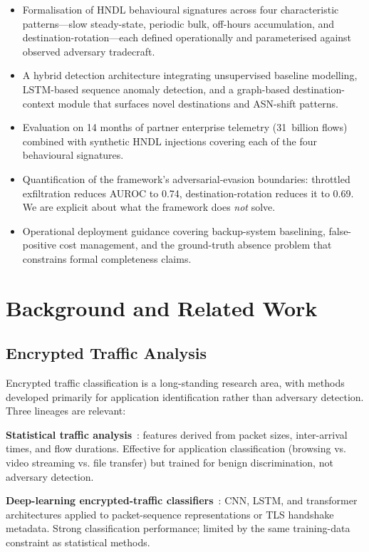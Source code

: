 \documentclass[sigconf,nonacm]{acmart}
\begin{document}
\begin{itemize}
  \item Formalisation of HNDL behavioural signatures across four
        characteristic patterns---slow steady-state, periodic bulk,
        off-hours accumulation, and destination-rotation---each
        defined operationally and parameterised against observed
        adversary tradecraft.
  \item A hybrid detection architecture integrating unsupervised
        baseline modelling, LSTM-based sequence anomaly detection,
        and a graph-based destination-context module that surfaces
        novel destinations and ASN-shift patterns.
  \item Evaluation on 14 months of partner enterprise telemetry
        (31~billion flows) combined with synthetic HNDL injections
        covering each of the four behavioural signatures.
  \item Quantification of the framework's adversarial-evasion
        boundaries: throttled exfiltration reduces AUROC to 0.74,
        destination-rotation reduces it to 0.69. We are explicit
        about what the framework does \emph{not} solve.
  \item Operational deployment guidance covering backup-system
        baselining, false-positive cost management, and the
        ground-truth absence problem that constrains formal
        completeness claims.
\end{itemize}

\section{Background and Related Work}

\subsection{Encrypted Traffic Analysis}

Encrypted traffic classification is a long-standing research area, with
methods developed primarily for application identification rather than
adversary detection. Three lineages are relevant:

\textbf{Statistical traffic analysis}~\cite{taylor2024etasurv}: features
derived from packet sizes, inter-arrival times, and flow durations.
Effective for application classification (browsing vs. video
streaming vs. file transfer) but trained for benign discrimination,
not adversary detection.

\textbf{Deep-learning encrypted-traffic classifiers}~\cite{aceto2024etcml,
zhang2025tlsdl}: CNN, LSTM, and transformer architectures applied to
packet-sequence representations or TLS handshake metadata. Strong
classification performance; limited by the same training-data
constraint as statistical methods.
\end{document}
